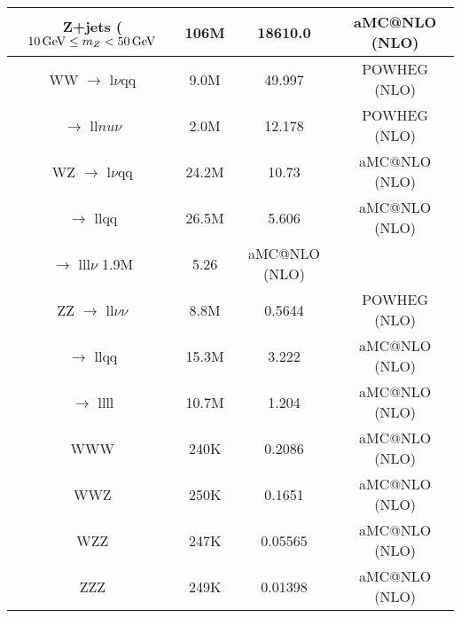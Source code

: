 \begin{table}[htbp]
{\begin{tabular}{cccc}
   Z+jets ($10 \,\text{Ge\hspace{-.08em}V} \leq m_{Z} < 50\,\text{Ge\hspace{-.08em}V}$ & 106M & 18610.0 & aMC@NLO (NLO) \\
   \hline
   WW $\rightarrow$ l$\nu$qq & 9.0M & 49.997  & POWHEG (NLO) \\
      $\rightarrow$ ll$nu\nu$ & 2.0M & 12.178 & POWHEG (NLO) \\
   \hline
   WZ $\rightarrow$ l$\nu$qq & 24.2M & 10.73 & aMC@NLO (NLO) \\
      $\rightarrow$ llqq & 26.5M & 5.606 & aMC@NLO (NLO) \\
      $\rightarrow$ lll$\nu$ 1.9M & 5.26 & aMC@NLO (NLO) \\
   \hline
   ZZ $\rightarrow$ ll$\nu\nu$ & 8.8M & 0.5644 & POWHEG (NLO) \\
      $\rightarrow$ llqq & 15.3M & 3.222 & aMC@NLO (NLO) \\
      $\rightarrow$ llll & 10.7M & 1.204 & aMC@NLO (NLO) \\
   \hline
   WWW & 240K & 0.2086 & aMC@NLO (NLO) \\
   \hline
   WWZ & 250K & 0.1651 & aMC@NLO (NLO) \\
   \hline
   WZZ & 247K & 0.05565 & aMC@NLO (NLO) \\
   \hline
   ZZZ & 249K & 0.01398 & aMC@NLO (NLO) \\
   \hline
   
 \end{tabular}}
\end{table}


